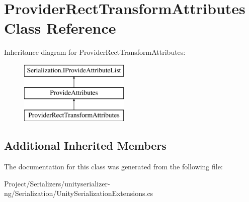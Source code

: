 \hypertarget{class_provider_rect_transform_attributes}{}\section{Provider\+Rect\+Transform\+Attributes Class Reference}
\label{class_provider_rect_transform_attributes}
Inheritance diagram for Provider\+Rect\+Transform\+Attributes\+:\begin{figure}[H]
\begin{center}
\leavevmode
\includegraphics[height=3.000000cm]{class_provider_rect_transform_attributes}
\end{center}
\end{figure}
\subsection*{Additional Inherited Members}


The documentation for this class was generated from the following file\+:\begin{DoxyCompactItemize}
\item 
Project/\+Serializers/unityserializer-\/ng/\+Serialization/Unity\+Serialization\+Extensions.\+cs\end{DoxyCompactItemize}
